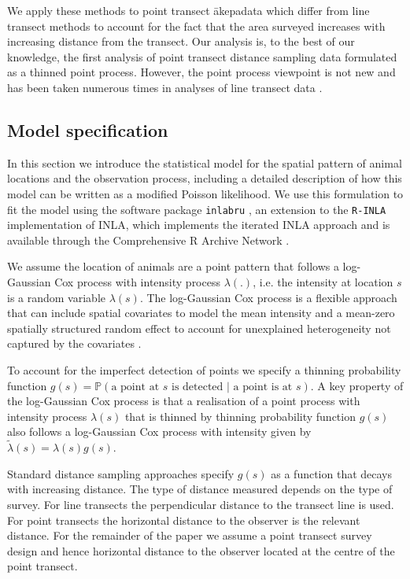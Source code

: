 \documentclass[preprint,12pt]{elsarticle}
\newcommand{\tl}{\tilde{\lambda}}   %
\newcommand{\akepa}{\textquotesingle\={a}kepa}  %
\begin{document}
We apply these methods to point transect \akepa data which differ from line transect methods to account for the fact that the area surveyed increases with increasing distance from the transect.  Our analysis is, to the best of our knowledge, the first analysis of point transect distance sampling data formulated as a thinned point process.  However, the point process viewpoint is not new and has been taken numerous times in analyses of line transect data \citep{buckland_model-based_2016, niemi_bayesian_2010, johnson_model-based_2010, waagepetersen_likelihood-based_2006, hedley_spatial_2004,  hogmander_random_1991, stoyan_remark_1982}.  

\subsection{Model specification}

In this section we introduce the statistical model for the spatial pattern of animal locations and the observation process, including a detailed description of how this model can be written as a modified Poisson likelihood.  We use this formulation to fit the model using the software package \texttt{inlabru} \citep{bachl_inlabru_2019}, an extension to the \texttt{R-INLA} implementation of INLA, which implements the iterated INLA approach and is available through the Comprehensive R Archive Network \citep{r_2017}.

We assume the location of animals are a point pattern that follows a log-Gaussian Cox process with intensity process $\lambda(.)$, i.e.  the intensity at location $s$ is a random variable $\lambda(s)$.  The log-Gaussian Cox process is a flexible approach that can include spatial covariates to model the mean intensity and a mean-zero spatially structured random effect to account for unexplained heterogeneity not captured by the covariates \citep{moller_log_1998}.

To account for the imperfect detection of points we specify a thinning probability function $g(s) = \mathbb{P}(\text{a point at $s$ is detected | a point is at $s$})$. A key property of the log-Gaussian Cox process is that a realisation of a point process with intensity process $\lambda(s)$ that is thinned by thinning probability function $g(s)$ also follows a log-Gaussian Cox process with intensity given by $\tl(s) = \lambda(s)g(s)$.

Standard distance sampling approaches specify $g(s)$ as a function that decays with increasing distance.  The type of distance measured depends on the type of survey.  For line transects the perpendicular distance to the transect line is used.  For point transects the horizontal distance to the observer is the relevant distance.  For the remainder of the paper we assume a point transect survey design and hence horizontal distance to the observer located at the centre of the point transect.  
\end{document}
